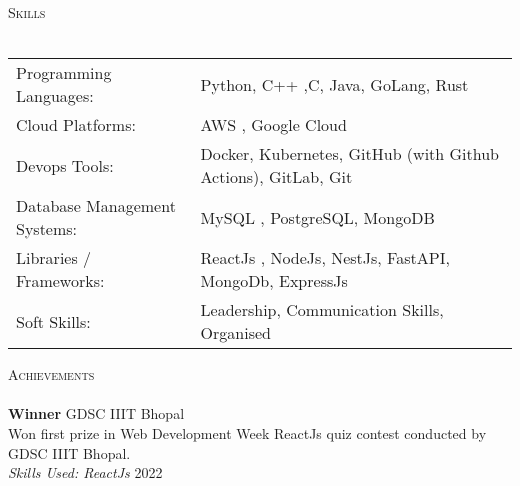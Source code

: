 \documentclass[a4paper]{article}
\newcommand{\lineunder} {
    \vspace*{-8pt} \\
    \hspace*{-18pt} \hrulefill \\
}
\newcommand{\header} [1] {
    {\hspace*{-18pt}\vspace*{6pt} \textsc{#1}}
    \vspace*{-6pt} \lineunder
}
\begin{document}
\header{Skills}
\vspace{2mm}
\begin{tabular}{ l l }
	Programming Languages: & Python, C++ ,C, Java, GoLang, Rust  \\
	Cloud Platforms:        & AWS , Google Cloud  \\
	Devops Tools:  & Docker, Kubernetes, GitHub (with Github Actions), GitLab, Git \\
	Database Management Systems: & MySQL , PostgreSQL, MongoDB \\ 
	Libraries / Frameworks: & ReactJs , NodeJs, NestJs, FastAPI, MongoDb, ExpressJs        \\
	Soft Skills:           &  Leadership, Communication Skills, Organised  \\
	
\end{tabular}


\vspace{2mm}
\header{Achievements}
\textbf{Winner} \hfill GDSC IIIT Bhopal\\
Won first prize in Web Development Week ReactJs quiz contest conducted by GDSC IIIT Bhopal.\\
{\textit {Skills Used: ReactJs}}  \hfill 2022\\
\end{document}
